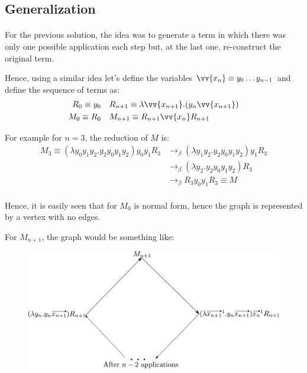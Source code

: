 \documentclass{beamer}
\theoremstyle{definition}
\theoremstyle{remark}
\theoremstyle{example}
\newif\ifinsection
\newif\ifinsubsection
\let\oldsubsection\subsection
\renewcommand{\subsection}{
  \global\insubsectiontrue
  \oldsubsection}
\newcommand {\aframe}[1] {
  \begin{frame}
    \ifinsection\frametitle{\secname}\fi
    \ifinsubsection\framesubtitle{\subsecname}\fi
  #1
  \end{frame}
}
\begin{document}
\subsection{Generalization}
\aframe{ For the previous solution, the idea was to generate a term in which
  there was only one possible application each step but, at
  the last one, re-construct the original term. \\
  \vspace{0.3cm}\pause

  Hence, using a similar idea let's define the variables
  $\vv{x_n} \equiv y_0 \ldots y_{n-1}$ and define the sequence of terms as:
  \begin{align*}
    R_0 \equiv y_0 &\quad R_{n+1} \equiv \lambda \vv{x_{n+1}}. (y_{n} \vv{x_{n+1}}) \\
    M_0 \equiv R_0 &\quad M_{n+1} \equiv R_{n+1} \vv{x_n} R_{n+1}
  \end{align*} \pause

  For example for $n=3$, the reduction of $M$ is:
  \begin{align*}
    M_3 \equiv (\lambda y_0y_1y_2. y_2y_0y_1y_2)y_0y_1R_3
    &\rightarrow_\beta (\lambda y_1y_2. y_2y_0y_1y_2)y_1R_3 \\
    &\rightarrow_\beta (\lambda y_2. y_2y_0y_1y_2)R_3 \\
    &\rightarrow_\beta R_3 y_0y_1R_3 \equiv M
  \end{align*}
}

\aframe{ Hence, it is easily seen that for $M_0$ is normal form,
  hence the graph is represented by a vertex with no edges. \pause \\
  \vspace{0.3cm}

  For $M_{n+1}$, the graph would be something like:
  \begin{figure}[H]
    \centering \includegraphics[scale=0.4]{../../graphs/exercise-3-5-2-i-n.pdf}
  \end{figure}
}
\end{document}
